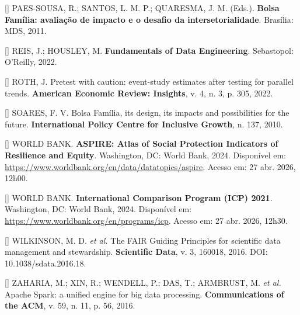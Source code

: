 \documentclass[12pt,a4paper,oneside]{article}
\begin{document}
\begin{singlespace}
\noindent\hangindent=1.25cm
[\theequation\label{ref:paes-sousa}]
PAES-SOUSA, R.; SANTOS, L. M. P.; QUARESMA, J. M. (Eds.).
\textbf{Bolsa Família: avaliação de impacto e o desafio da
intersetorialidade}. Brasília: MDS, 2011.\par\smallskip

\noindent\hangindent=1.25cm
[\theequation\label{ref:reis-housley}]
REIS, J.; HOUSLEY, M. \textbf{Fundamentals of Data Engineering}.
Sebastopol: O'Reilly, 2022.\par\smallskip

\noindent\hangindent=1.25cm
[\theequation\label{ref:roth}]
ROTH, J. Pretest with caution: event-study estimates after testing
for parallel trends. \textbf{American Economic Review: Insights},
v. 4, n. 3, p. 305, 2022.\par\smallskip

\noindent\hangindent=1.25cm
[\theequation\label{ref:soares}]
SOARES, F. V. Bolsa Família, its design, its impacts and possibilities
for the future. \textbf{International Policy Centre for Inclusive
Growth}, n. 137, 2010.\par\smallskip

\noindent\hangindent=1.25cm
[\theequation\label{ref:wb-aspire}]
WORLD BANK. \textbf{ASPIRE: Atlas of Social Protection Indicators
of Resilience and Equity}. Washington, DC: World Bank, 2024.
Disponível em:
\url{https://www.worldbank.org/en/data/datatopics/aspire}. Acesso
em: 27 abr. 2026, 12h00.\par\smallskip

\noindent\hangindent=1.25cm
[\theequation\label{ref:wb-icp}]
WORLD BANK. \textbf{International Comparison Program (ICP) 2021}.
Washington, DC: World Bank, 2024. Disponível em:
\url{https://www.worldbank.org/en/programs/icp}. Acesso em:
27 abr. 2026, 12h30.\par\smallskip

\noindent\hangindent=1.25cm
[\theequation\label{ref:wilkinson}]
WILKINSON, M. D. \textit{et al.} The FAIR Guiding Principles for
scientific data management and stewardship. \textbf{Scientific Data},
v. 3, 160018, 2016. DOI: 10.1038/sdata.2016.18.\par\smallskip

\noindent\hangindent=1.25cm
[\theequation\label{ref:zaharia}]
ZAHARIA, M.; XIN, R.; WENDELL, P.; DAS, T.; ARMBRUST, M. \textit{et
al.} Apache Spark: a unified engine for big data processing.
\textbf{Communications of the ACM}, v. 59, n. 11, p. 56,
2016.\par\smallskip


\end{singlespace}
\end{document}
